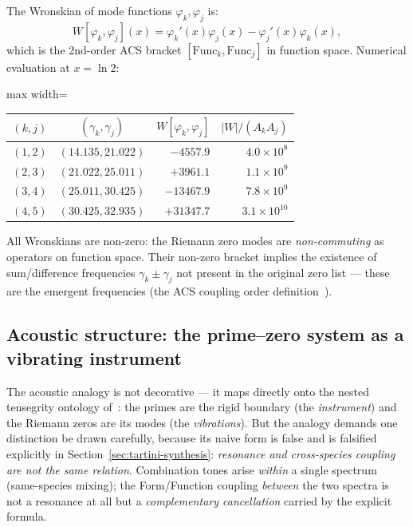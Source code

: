 \documentclass[11pt,a4paper]{article}
\theoremstyle{plain}
\theoremstyle{definition}
\theoremstyle{remark}
\begin{document}
The Wronskian of mode functions $\varphi_k, \varphi_j$ is:
\begin{equation}
  W[\varphi_k, \varphi_j](x) = \varphi_k'(x)\varphi_j(x) - \varphi_j'(x)\varphi_k(x),
\end{equation}
which is the 2nd-order ACS bracket $[\mathrm{Func}_k, \mathrm{Func}_j]$ 
in function space.  Numerical evaluation at $x = \ln 2$:
\begin{center}
\begin{adjustbox}{max width=\linewidth}\begin{tabular}{ccrr}
\toprule
$(k,j)$ & $(\gamma_k, \gamma_j)$ & $W[\varphi_k,\varphi_j]$ & $|W|/(A_k A_j)$ \\
\midrule
$(1,2)$ & $(14.135, 21.022)$ & $-4557.9$ & $4.0 \times 10^8$ \\
$(2,3)$ & $(21.022, 25.011)$ & $+3961.1$ & $1.1 \times 10^9$ \\
$(3,4)$ & $(25.011, 30.425)$ & $-13467.9$ & $7.8 \times 10^9$ \\
$(4,5)$ & $(30.425, 32.935)$ & $+31347.7$ & $3.1 \times 10^{10}$ \\
\bottomrule
\end{tabular}\end{adjustbox}
\end{center}

All Wronskians are non-zero: the Riemann zero modes are \emph{non-commuting} 
as operators on function space.  Their non-zero bracket implies the existence of 
sum/difference frequencies $\gamma_k \pm \gamma_j$ not present in 
the original zero list --- these are the emergent frequencies 
(the ACS coupling order definition~\cite{Wallace2026a}).

\subsection{Acoustic structure: the prime--zero system as a vibrating instrument}

The acoustic analogy is not decorative --- it maps directly onto
the nested tensegrity ontology of~\cite{Wallace2026a}: the primes are
the rigid boundary (the \emph{instrument}) and the Riemann zeros are its
modes (the \emph{vibrations}).  But the analogy demands one distinction
be drawn carefully, because its naive form is false and is falsified
explicitly in Section~\ref{sec:tartini-synthesis}: \emph{resonance and
cross-species coupling are not the same relation}.  Combination tones
arise \emph{within} a single spectrum (same-species mixing); the
Form/Function coupling \emph{between} the two spectra is not a resonance
at all but a \emph{complementary cancellation} carried by the explicit
formula.
\end{document}
